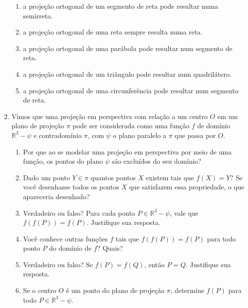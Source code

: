 \begin{enumerate}
\begin{enumerate}
\item a projeção ortogonal de um segmento de reta pode resultar numa semirreta.

\item a projeção ortogonal de uma reta sempre resulta numa reta.

\item a projeção ortogonal de uma parábola pode resultar num segmento de reta.

\item a projeção ortogonal de um triângulo pode resultar num quadrilátero.

\item a projeção ortogonal de uma circunferência pode resultar num segmento de reta.
\end{enumerate}

\item Vimos que uma projeção em perspectiva com relação a um centro \(O\) em um plano de projeção \(\pi\) pode ser considerada como uma função \(f\) de domínio \({\mathbb R}^{3} - \psi\) e contradomínio \(\pi\), com \(\psi\) o plano paralelo a \(\pi\) que passa por \(O\).
\begin{enumerate}
\item {} 
Por que ao se modelar uma projeção em perspectiva por meio de uma função, os pontos do plano \(\psi\) são excluídos do seu domínio?

\item {} 
Dado um ponto \(Y \in \pi\) quantos pontos \(X\) existem tais que \(f(X) = Y\)? Se você desenhasse todos os pontos \(X\) que satisfazem essa propriedade, o que apareceria desenhado?

\item {} 
Verdadeiro ou falso? Para cada ponto \(P \in {\mathbb R}^{3} - \psi\), vale que \(f(f(P)) = f(P)\). Justifique sua resposta.

\item {} 
Você conhece outras funções \(f\) tais que \(f(f(P)) = f(P)\) para todo ponto \(P\) do domínio de \(f\)? Quais?

\item {} 
Verdadeiro ou falso? Se \(f(P) = f(Q)\), então \(P = Q\). Justifique sua resposta.

\item {} 
Se o centro \(O\) é um ponto do plano de projeção \(\pi\), determine \(f(P)\) para todo \(P \in {\mathbb R}^{3} - \psi\).

\end{enumerate}


\end{enumerate}
